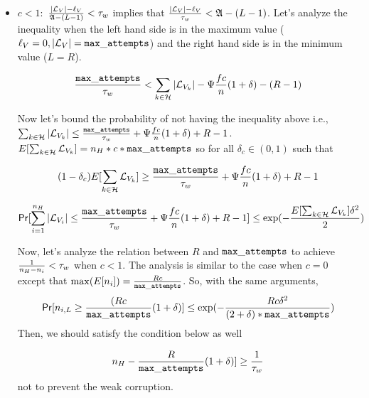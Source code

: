 \begin{itemize}
	\item $ c < 1: $  $ \frac{|\mathcal{L}_V|- \ell_V}{\mathfrak{A}-(L-1)} <  \tau_w$  implies that $ \frac{|\mathcal{L}_V|- \ell_V}{\tau_w} < \mathfrak{A}-(L-1)  $. Let's analyze the inequality when the left hand side is in the maximum value ($ \ell_V = 0, |\mathcal{L}_V| = \mathtt{max\_attempts}$) and the right hand side is in the minimum value ($ L = R $).
	
	$$ \frac{\mathtt{max\_attempts}}{\tau_w} <  \sum_{k \in \mathcal{H}} |\mathcal{L}_{V_k}| -  \Psi \frac{fc}{n} (1+ \delta)-(R-1)  $$
	
	
	Now let's bound the probability of not having the inequality above i.e.,	$  \sum_{k \in \mathcal{H}} |\mathcal{L}_{V_k}|   \leq \frac{\mathtt{max\_attempts}}{\tau_w} + \Psi \frac{fc}{n} (1+ \delta) +R-1$. 
	$E[\sum_{k\in\mathcal{H}}\mathcal{L}_{V_k}] = n_H*c * \mathtt{max\_attempts} $ so  for all $ \delta_c \in (0,1) $ such that 
	
	\begin{equation}\label{cond:lc1}
	(1-\delta_c) E[\sum_{k \in \mathcal{H}}\mathcal{L}_{V_k}] \geq \frac{\mathtt{max\_attempts}}{\tau_w} + \Psi \frac{fc}{n} (1+ \delta) +R-1 
	\end{equation}
	
	
	\begin{equation}\label{eq:duringepoch}
	\mathsf{Pr}[\sum_{i = 1}^{n_H}|\mathcal{L}_{V_i}| \leq \frac{\mathtt{max\_attempts}}{\tau_w} + \Psi \frac{fc}{n} (1+ \delta) +R-1] \leq \exp(-\frac{E[\sum_{k \in \mathcal{H}}\mathcal{L}_{V_k}]\delta^2}{2} ) \nonumber
	\end{equation}
	
	Now, let's analyze the relation between $ R $ and $ \mathtt{max\_attempts} $ to achieve $ \frac{1}{n_H - n_i} < \tau_w$ when $ c < 1 $. The analysis is similar to the case when $ c=0 $ except that $ \max(E[n_{i}]) = \frac{Rc}{\mathtt{max\_attempts}} $. So, with the same arguments,
	\begin{equation}
	\mathsf{Pr}[n_{i,L} \geq    \frac{(Rc}{\mathtt{max\_attempts}} (1+\delta)] \leq \exp(-\frac{Rc\delta^2}{(2+\delta)*\mathtt{max\_attempts}})  \nonumber
	\end{equation} 
	Then, we should satisfy the condition below as well
	
	\begin{equation}\label{cond:nl1}
	n_H -\frac{R}{\mathtt{max\_attempts}} (1+\delta)]  \geq \frac{1}{\tau_w} 
	\end{equation}
	not to prevent the weak corruption.
	
\end{itemize}


